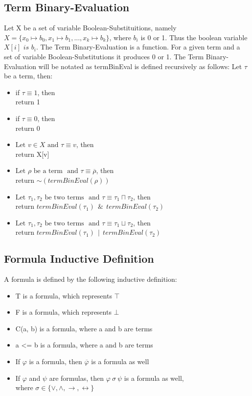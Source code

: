 \documentclass{article}
\begin{document}
	\subsection*{Term Binary-Evaluation}
		Let X be a set of variable Boolean-Substituitions, namely $ X = \{ x_0 \longmapsto b_0, x_1 \longmapsto b_1, ..., x_k \longmapsto b_k \}$, where $b_i$ is 0 or 1.
		Thus the boolean variable $X[i] \textit{ is } b_i$.
		The Term Binary-Evaluation is a function. For a given term and a set of variable Boolean-Substitutions it produces 0 or 1.
		\newline
		\newline
		The Term Binary-Evaluation will be notated as termBinEval is defined recursively as follows:
		\newline
		Let $\tau$ be a term, then:
		\begin{itemize}
			\item if $\tau \equiv 1$, then \\
				return 1
			\item if $\tau \equiv 0$, then \\
				return 0
			\item $\text{Let } v \in X \text{ and } \tau \equiv v$, then \\
				return X[v]
			\item $\text{Let } \rho \text{ be a term } \text{ and } \tau \equiv \overline{\rho}$, then \\
				return $\sim(termBinEval(\rho))$ 
			\item $\text{Let } \tau_1, \tau_2 \text{ be two terms } \text{ and } \tau \equiv \tau_1 \sqcap \tau_2$, then \\
				return $termBinEval(\tau_1)\ \  \&\ \  termBinEval(\tau_2)$
			\item $\text{Let } \tau_1, \tau_2 \text{ be two terms } \text{ and } \tau \equiv \tau_1 \sqcup \tau_2$, then \\
				return $termBinEval(\tau_1)\ \  |\ \  termBinEval(\tau_2)$
		\end{itemize}

	\subsection{Formula Inductive Definition}
	\label{sec:formula-inductive-definition}
		A formula is defined by the following inductive definition:
		\begin{itemize}
			\item T is a formula, which represents $\top$
			\item F is a formula, which represents $\bot$
			\item C(a, b) is a formula, where a and b are terms
			\item a <= b is a formula, where a and b are terms
			\item If $\varphi$ is a formula, then $\overline{\varphi}$ is a formula as well
			\item If $\varphi$ and $\psi$ are formulas, then $\varphi \: \sigma \: \psi $ is a formula as well,\\
				where $\sigma \in \{\vee, \wedge, \rightarrow, \leftrightarrow\}$
		\end{itemize}
\end{document}
